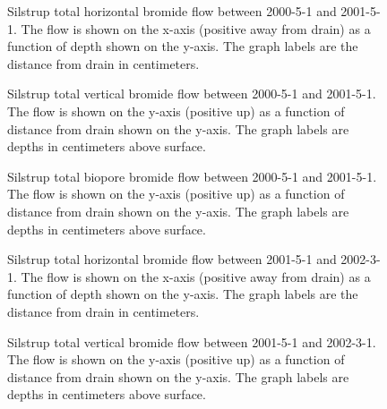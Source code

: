 \begin{figure}[htbp]
  \centering
  
  \caption{Silstrup total horizontal bromide flow between 2000-5-1 and
    2001-5-1.  The flow is shown on the x-axis (positive away from
    drain) as a function of depth shown on the y-axis.  The graph
    labels are the distance from drain in centimeters.}
  \label{fig:Silstrup-Bromide-2000-horizontal}
\end{figure}\FloatBarrier

\begin{figure}[htbp]
  \centering
  
  \caption{Silstrup total vertical bromide flow between 2000-5-1 and
    2001-5-1.  The flow is shown on the y-axis (positive up) as a
    function of distance from drain shown on the y-axis.  The graph
    labels are depths in centimeters above surface.}
  \label{fig:Silstrup-Bromide-2000-vertical}
\end{figure}\FloatBarrier

\begin{figure}[htbp]
  \centering
  
  \caption{Silstrup total biopore bromide flow between 2000-5-1 and
    2001-5-1.  The flow is shown on the y-axis (positive up) as a
    function of distance from drain shown on the y-axis.  The graph
    labels are depths in centimeters above surface.}
  \label{fig:Silstrup-Bromide-biopore-2000}
\end{figure}\FloatBarrier

\begin{figure}[htbp]
  \centering
  
  \caption{Silstrup total horizontal bromide flow between 2001-5-1 and
    2002-3-1.  The flow is shown on the x-axis (positive away from
    drain) as a function of depth shown on the y-axis.  The graph
    labels are the distance from drain in centimeters.}
  \label{fig:Silstrup-Bromide-2001-horizontal}
\end{figure}\FloatBarrier

\begin{figure}[htbp]
  \centering
  
  \caption{Silstrup total vertical bromide flow between 2001-5-1 and
    2002-3-1.  The flow is shown on the y-axis (positive up) as a
    function of distance from drain shown on the y-axis.  The graph
    labels are depths in centimeters above surface.}
  \label{fig:Silstrup-Bromide-2001-vertical}
\end{figure}\FloatBarrier


